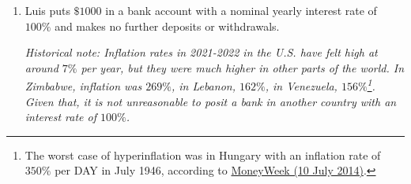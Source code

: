 \documentclass[main]{subfiles}
\begin{document}
\begin{enumerate}
\begin{enumerate}[topsep=0pt]
    \begin{solution}
      We now know that $\lim\limits_{x\to\infty} x\ln\left(1+\frac{1}{x}\right)=1$,
      so we can solve for $y$:
      \begin{align*}
        \ln y &= \lim\limits_{x\to\infty} x\ln\left(1+\frac{1}{x}\right) \\
        &= 1 \\
        \shortintertext{Switching to exponential form,}
        y &= e^1 \\
        &= \boxed{e.}
      \end{align*}
    \end{solution}

    
    \begin{center}
    \end{center}
  \end{enumerate}


  This particular limit (and $e$!) comes up in a variety of settings. One is particularly applicable and we saw in Math Ma. Recall from our work with compound interest last semester: 

  \begin{framed}
      The amount of of money in an account after $t$ years is
      $$M(t) = M_0\Big(1+ \frac{r}{n}\Big)^{nt}$$
      where 
      \begin{itemize}
        \item $M(t)$ is the amount of money in the account after $t$ years
        \item $M_0$ is the original amount of money
        \item $r$ is the annual interest rate
        \item $n$ is the number of compounding periods per year

      \end{itemize}
  \end{framed}


  \item  Luis puts $\$1000$ in a bank account with a nominal yearly interest rate of
    $100\%$ and makes no further deposits or withdrawals.
    
    \emph{Historical note: Inflation rates in 2021-2022 in the U.S. have felt high
    at around $7\%$ per year, but they were much higher in other parts of the
    world. In Zimbabwe, inflation was $269\%$, in Lebanon, $162\%$, in Venezuela,
    $156\%$\footnote{The worst case of hyperinflation was in Hungary with an
    inflation rate of $350\%$ per DAY in July 1946, according to \href{https://moneyweek.com/329219/10-july-1946-hungary-suffers-the-worlds-worst-hyperinflation}{MoneyWeek (10 July 2014)}.}.
    Given that, it is not unreasonable to posit a bank in another country
    with an interest rate of $100\%$.}


\end{enumerate}
\end{document}
